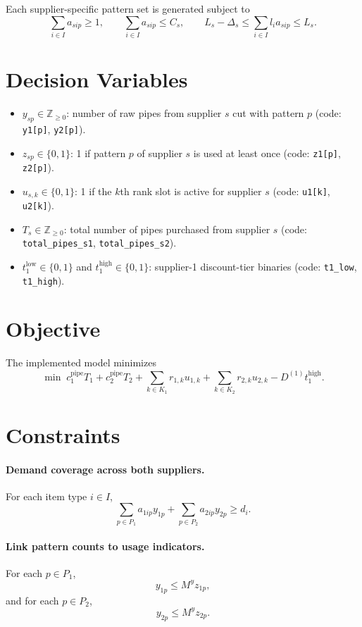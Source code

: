 Each supplier-specific pattern set is generated subject to
\[
\sum_{i\in I} a_{sip} \ge 1,\qquad
\sum_{i\in I} a_{sip} \le C_s,\qquad
L_s-\Delta_s \le \sum_{i\in I} l_i a_{sip} \le L_s.
\]

\section*{Decision Variables}

\begin{itemize}
    \item $y_{sp}\in \mathbb{Z}_{\ge 0}$: number of raw pipes from supplier $s$ cut with pattern $p$ (code: \texttt{y1[p]}, \texttt{y2[p]}).
    \item $z_{sp}\in \{0,1\}$: 1 if pattern $p$ of supplier $s$ is used at least once (code: \texttt{z1[p]}, \texttt{z2[p]}).
    \item $u_{s,k}\in \{0,1\}$: 1 if the $k$th rank slot is active for supplier $s$ (code: \texttt{u1[k]}, \texttt{u2[k]}).
    \item $T_s\in \mathbb{Z}_{\ge 0}$: total number of pipes purchased from supplier $s$ (code: \texttt{total\_pipes\_s1}, \texttt{total\_pipes\_s2}).
    \item $t^{\text{low}}_1\in\{0,1\}$ and $t^{\text{high}}_1\in\{0,1\}$: supplier-1 discount-tier binaries (code: \texttt{t1\_low}, \texttt{t1\_high}).
\end{itemize}

\section*{Objective}

The implemented model minimizes
\[
\min\;
c_1^{\text{pipe}} T_1 + c_2^{\text{pipe}} T_2
+ \sum_{k\in K_1} r_{1,k} u_{1,k}
+ \sum_{k\in K_2} r_{2,k} u_{2,k}
- D^{(1)} t^{\text{high}}_1.
\]

\section*{Constraints}

\paragraph{Demand coverage across both suppliers.}
For each item type $i\in I$,
\[
\sum_{p\in P_1} a_{1ip} y_{1p} + \sum_{p\in P_2} a_{2ip} y_{2p} \ge d_i.
\]

\paragraph{Link pattern counts to usage indicators.}
For each $p\in P_1$,
\[
y_{1p} \le M^y z_{1p},
\]
and for each $p\in P_2$,
\[
y_{2p} \le M^y z_{2p}.
\]

